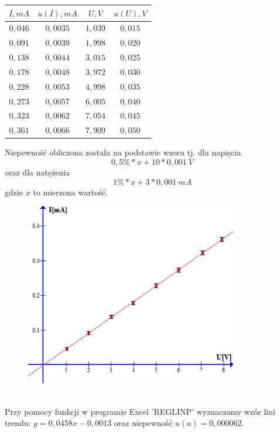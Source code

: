 \documentclass{article}
\begin{document}
\begin{center}
    \begin{tabular}{|c|c|c|c|}
    \hline
$I,mA$ & $u(I), mA$ & $U,V$ & $u(U), V$\\ \hline
$0,046$ & $0,0035$ & $1,039$ & $0,015$\\ \hline
$0,091$ & $0,0039$ & $1,998$ & $0,020$\\ \hline
$0,138$ & $0,0044$ & $3,015$ & $0,025$\\ \hline
$0,178$ & $0,0048$ & $3,972$ & $0,030$\\ \hline
$0,228$ & $0,0053$ & $4,998$ & $0,035$\\ \hline
$0,273$ & $0,0057$ & $6,005$ & $0,040$\\ \hline
$0,323$ & $0,0062$ & $7,054$ & $0,045$\\ \hline
$0,361$ & $0,0066$ & $7,909$ & $0,050$\\ \hline
    \end{tabular}
\end{center}
Niepewność obliczona została na podstawie wzoru tj. dla napięcia
$$0,5\% * x + 10 * 0,001\ V $$
oraz dla natężenia
$$1\% * x + 3 * 0,001\ mA$$
gdzie $x$ to mierzona wartość.
\begin{figure}[ht]
\centering
\includegraphics[height=8cm]{wykres_6.png}
\end{figure}\\
Przy pomocy funkcji w programie Excel 'REGLINP' wyznaczamy wzór lini trendu: $y = 0,0458x - 0,0013$ oraz niepewność $u(a) = 0,000062$.
\end{document}
